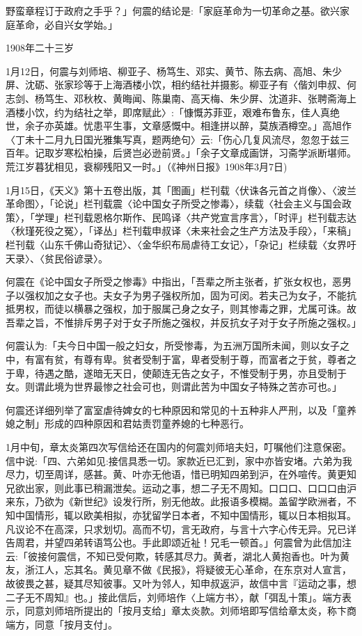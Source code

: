 \noindent 野蛮章程订于政府之手乎？」何震的结论是:「家庭革命为一切革命之基。欲兴家庭革命，必自兴女学始。」

1908年二十三岁

1月12日，何震与刘师培、柳亚子、杨笃生、邓实、黄节、陈去病、高旭、朱少屏、沈砺、张家珍等于上海酒楼小饮，相约结社并摄影。柳亚子有〈偕刘申叔、何志剑、杨笃生、邓秋枚、黄晦闻、陈巢南、高天梅、朱少屏、沈道非、张聘斋海上酒楼小饮，约为结社之举，即席赋此〉:「慷慨苏菲亚，艰难布鲁东，佳人真绝世，余子亦英雄。忧患平生事，文章感慨中。相逢拼以醉，莫族酒樽空。」高旭作〈丁未十二月九日国光雅集写真，题两绝句〉云:「伤心几复风流尽，忽忽于兹三百年。记取岁寒松柏操，后贤岂必逊前贤。」「余子文章成画饼，习斋学派断堪师。荒江岁暮犹相见，衰柳残阳又一时。」（《神州日报》1908年3月7日)

1月15日，《天义》第十五卷出版，其「图画」栏刊载〈伏诛各元首之肖像〉、〈波兰革命图〉，「论说」栏刊载震〈论中国女子所受之惨毒〉，续载〈社会主义与国会政策〉，「学理」栏刊载恩格尔斯作、民鸣译〈共产党宣言序言〉，「时评」栏刊载志达〈秋瑾死役之冤〉，「译丛」栏刊载申叔译〈未来社会之生产方法及手段〉，「来稿」栏刊载〈山东千佛山奇狱记〉、〈金华织布局虐待工女记〉，「杂记」栏续载〈女界吁天录〉、〈贫民俗谚录〉。

何震在《论中国女子所受之惨毒》中指出，「吾辈之所主张者，扩张女权也，恶男子以强权加之女子也。夫女子为男子强权所加，固为可闵。若夫己为女子，不能抗抵男权，而徒以横暴之强权，加于服属己身之女子，则其惨毒之罪，尤属可诛。故吾辈之旨，不惟排斥男子对于女子所施之强权，并反抗女子对于女子所施之强权。」

何震认为:「夫今日中国一般之妇女，所受惨毒，为五洲万国所未闻，则以女子之中，有富有贫，有尊有卑。贫者受制于富，卑者受制于尊，而富者之于贫，尊者之于卑，待遇之酷，遂暗无天日，使颠连无告之女子，不惟受制于男，亦且受制于女。则谓此境为世界最惨之社会可也，则谓此苦为中国女子特殊之苦亦可也。」


\noindent 何震还详细列举了富室虐待婢女的七种原因和常见的十五种非人严刑，以及「童养媳之制」形成的四种原因和君姑责罚童养媳的七种恶行。

1月中旬，章太炎第四次写信给还在国内的何震刘师培夫妇，叮嘱他们注意保密。信中说:「四、六弟如见:接信具悉一切。家款近已汇到，家中亦皆安堵。六弟为我尽力，切至周详，感甚。黄、叶亦无他语，惜已明知四弟到沪，在外喧传。黄更知兄欲出家，则此事已稍漏泄矣。运动之事，想二子无不周知。口口口、口口口由沪来东，乃欲为《新世纪》设发行所，别无他故。此报语多模糊。盖留学欧洲者，不知中国情形，辄以欧美相拟，亦犹留学日本者，不知中国情形，辄以日本相拟耳。凡议论不在高深，只求划切。高而不切，言无政府，与言十六字心传无异。兄已详告周君，并望四弟转语笃公也。手此即颂近祉！兄毛一顿首。」何震曾为此信加注云:「彼接何震信，不知已受何欺，转感其尽力。黄者，湖北人黄抱香也。叶为黄友，浙江人，忘其名。黄见章不做《民报》，将疑彼无心革命，在东京对人宣言，故彼畏之甚，疑其尽知彼事。又叶为邻人，知申叔返沪，故信中言『运动之事，想二子无不周知』也。」接此信后，刘师培作〈上端方书〉，献「弭乱十策」。端方表示，同意刘师培所提出的「按月支给」章太炎款。刘师培即写信给章太炎，称卞商端方，同意「按月支付」。

